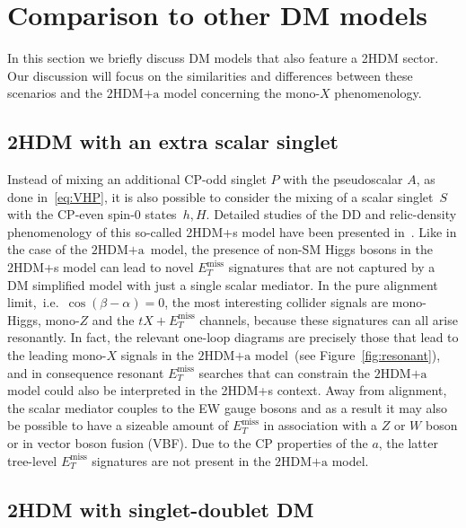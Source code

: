 \documentclass[a4paper, 11pt,notoc]{article}
\newcommand{\MET}{\ensuremath{E_T^\mathrm{miss}}\xspace}
\newcommand{\hdma}{\ensuremath{\textrm{2HDM+a}}\xspace}
\begin{document}

\section{Comparison to other DM models}
\label{sec:comparison}

In this section we briefly discuss DM models that also feature a 2HDM sector.  Our discussion will focus on the similarities and differences between these scenarios and the \hdma model  concerning the mono-$X$ phenomenology. 

\subsection{2HDM with an extra scalar singlet}
\label{sec:2HDMs}

Instead of mixing an additional CP-odd singlet $P$ with the pseudoscalar $A$, as done in~\eqref{eq:VHP}, it is also possible to consider the mixing of a  scalar singlet~$S$ with  the CP-even spin-0 states~$h,H$. Detailed studies of the DD and relic-density phenomenology of this so-called 2HDM+s model have been presented in~\cite{Bell:2016ekl,Bell:2017rgi}.  Like in the case of the \hdma~model, the presence of  non-SM Higgs bosons in the 2HDM+s model can lead to novel $\MET$ signatures that are not captured by a DM simplified model with just a single scalar mediator. In the pure alignment limit,~i.e.~$\cos ( \beta - \alpha) = 0$, the most interesting collider signals are mono-Higgs, mono-$Z$ and the $t X + \MET$  channels, because  these signatures can all arise resonantly.  In fact, the relevant one-loop diagrams are precisely those that  lead to the leading mono-$X$ signals in the \hdma model~(see Figure~\ref{fig:resonant}), and in consequence resonant $\MET$ searches that can constrain the \hdma model could also be interpreted in the 2HDM+s context. Away from alignment, the scalar mediator couples to the EW gauge bosons and as a result it may also be possible to have a sizeable amount of $\MET$ in association with a $Z$ or $W$ boson or in  vector boson fusion (VBF). Due to the CP properties of the $a$, the latter tree-level $\MET$ signatures are not present in the \hdma model. 

\subsection{2HDM with singlet-doublet DM}
\end{document}
